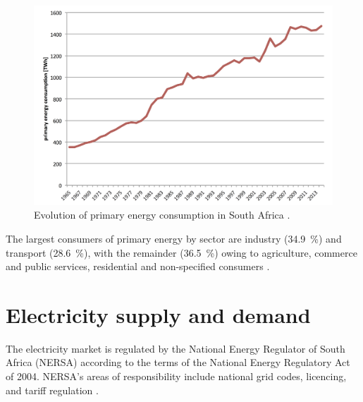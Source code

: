 \begin{figure}[htbp]  
\centering
\includegraphics[width=1\linewidth]{FIG/PrimEnergyDevelopment}
\caption[Evolution of primary energy consumption in South Africa.]{Evolution of primary energy consumption in South Africa \cite{BP2015c}.}\label{PrimEnergyDevelopment}
\end{figure}
The largest consumers of primary energy by sector are industry (\SI{34.9}{\percent}) and transport (\SI{28.6}{\percent}), with the remainder (\SI{36.5}{\percent}) owing to agriculture, commerce and public services, residential and non-specified consumers \cite{DepartmentofEnergy2012}.

\pagebreak
\section{Electricity supply and demand} \label{ElectricitySA}
The electricity market is regulated by the National Energy Regulator of South Africa (NERSA) according to the terms of the National Energy Regulatory Act of 2004. NERSA's areas of responsibility include national grid codes, licencing, and tariff regulation \cite{Eskom2015a}.

